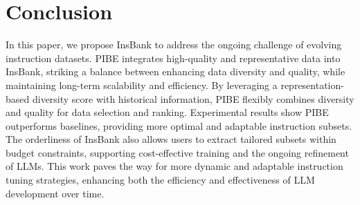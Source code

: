 \section{Conclusion}

In this paper, we propose InsBank to address the ongoing challenge of evolving instruction datasets. PIBE integrates high-quality and representative data into InsBank, striking a balance between enhancing data diversity and quality, while maintaining long-term scalability and efficiency. By leveraging a representation-based diversity score with historical information, PIBE flexibly combines diversity and quality for data selection and ranking. Experimental results show PIBE outperforms baselines, providing more optimal and adaptable instruction subsets. The orderliness of InsBank also allows users to extract tailored subsets within budget constraints, supporting cost-effective training and the ongoing refinement of LLMs. This work paves the way for more dynamic and adaptable instruction tuning strategies, enhancing both the efficiency and effectiveness of LLM development over time.